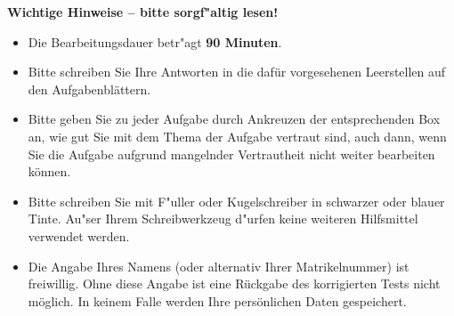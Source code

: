 \documentclass[12pt,answers]{exam}
\begin{document}
\begin{center} \textbf{Wichtige Hinweise -- bitte sorgf"altig lesen!} \end{center}
\begin{itemize}
\item Die Bearbeitungsdauer betr"agt \textbf{90 Minuten}.

\item Bitte schreiben Sie Ihre Antworten in die daf\"ur vorgesehenen
Leerstellen auf den Aufgabenbl\"attern.

\item Bitte geben Sie zu jeder Aufgabe durch Ankreuzen der entsprechenden
Box an, wie gut Sie mit dem Thema der Aufgabe vertraut sind, auch dann,
wenn Sie die Aufgabe aufgrund mangelnder Vertrautheit nicht weiter
bearbeiten können.

\item Bitte schreiben Sie mit F"uller oder Kugelschreiber in schwarzer oder
blauer Tinte. Au"ser Ihrem Schreibwerkzeug 
d"urfen keine weiteren Hilfsmittel verwendet werden.

\item Die Angabe Ihres Namens (oder alternativ Ihrer Matrikelnummer) ist
freiwillig. Ohne diese Angabe ist eine Rückgabe des korrigierten Tests
nicht möglich. In keinem Falle werden Ihre persönlichen Daten gespeichert.

\end{itemize}

\clearpage
\end{document}
